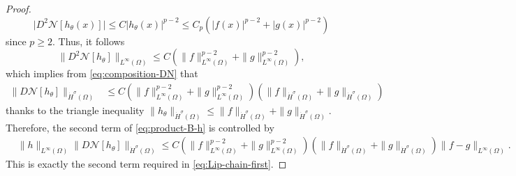 \documentclass[10pt,a4paper]{amsart}
\numberwithin{equation}{section}
\begin{document}
\begin{proof}
\[
\big|D^2\mathcal{N}[h_\theta(x)]\big|
\le
C|h_\theta(x)|^{p-2}
\le
C_p
\left(
|f(x)|^{p-2}+|g(x)|^{p-2}
\right)
\]
since \(p\ge2\). Thus, it follows
\begin{equation*}
\big\|D^2\mathcal N[h_\theta]\big\|_{L^\infty(\Omega)}
\le
C
\left(
\|f\|_{L^\infty(\Omega)}^{p-2}
+
\|g\|_{L^\infty(\Omega)}^{p-2}
\right),
\end{equation*}
which implies from \eqref{eq:composition-DN} that
\begin{align*}
\big\|D\mathcal{N}[h_\theta]\big\|_{\dot H^\sigma(\Omega)}
&\le
C
\left(
\|f\|_{L^\infty(\Omega)}^{p-2}
+
\|g\|_{L^\infty(\Omega)}^{p-2}
\right) \left(
\|f\|_{\dot H^\sigma(\Omega)}
+
\|g\|_{\dot H^\sigma(\Omega)}
\right)
\end{align*}
thanks to the triangle inequality $\|h_\theta\|_{\dot H^\sigma(\Omega)} \le
\|f\|_{\dot H^\sigma(\Omega)}
+
\|g\|_{\dot H^\sigma(\Omega)}$. Therefore, the second term of \eqref{eq:product-B-h} is controlled by
\begin{align}
&\|h\|_{L^\infty(\Omega)}
\big\|D\mathcal{N}[h_\theta]\big\|_{\dot H^\sigma(\Omega)}
\le
C
\left(
\|f\|_{L^\infty(\Omega)}^{p-2}
+
\|g\|_{L^\infty(\Omega)}^{p-2}
\right)
\left(
\|f\|_{\dot H^\sigma(\Omega)}
+
\|g\|_{\dot H^\sigma(\Omega)}
\right)
\|f-g\|_{L^\infty(\Omega)}.
\label{eq:second-product-term}
\end{align}
This is exactly the second term required in
\eqref{eq:Lip-chain-first}. \medskip


\end{proof}
\end{document}
